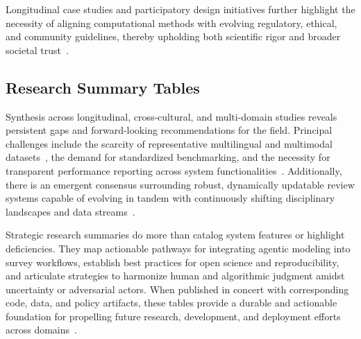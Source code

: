 Longitudinal case studies and participatory design initiatives further highlight the necessity of aligning computational methods with evolving regulatory, ethical, and community guidelines, thereby upholding both scientific rigor and broader societal trust~\cite{ref106}\cite{ref111}\cite{ref117}.

\subsection{Research Summary Tables}

Synthesis across longitudinal, cross-cultural, and multi-domain studies reveals persistent gaps and forward-looking recommendations for the field. Principal challenges include the scarcity of representative multilingual and multimodal datasets~\cite{ref108,ref110}, the demand for standardized benchmarking, and the necessity for transparent performance reporting across system functionalities~\cite{ref113,ref114}. Additionally, there is an emergent consensus surrounding robust, dynamically updatable review systems capable of evolving in tandem with continuously shifting disciplinary landscapes and data streams~\cite{ref114,ref115,ref117}.

Strategic research summaries do more than catalog system features or highlight deficiencies. They map actionable pathways for integrating agentic modeling into survey workflows, establish best practices for open science and reproducibility, and articulate strategies to harmonize human and algorithmic judgment amidst uncertainty or adversarial actors. When published in concert with corresponding code, data, and policy artifacts, these tables provide a durable and actionable foundation for propelling future research, development, and deployment efforts across domains~\cite{ref113,ref114,ref115,ref117}.

